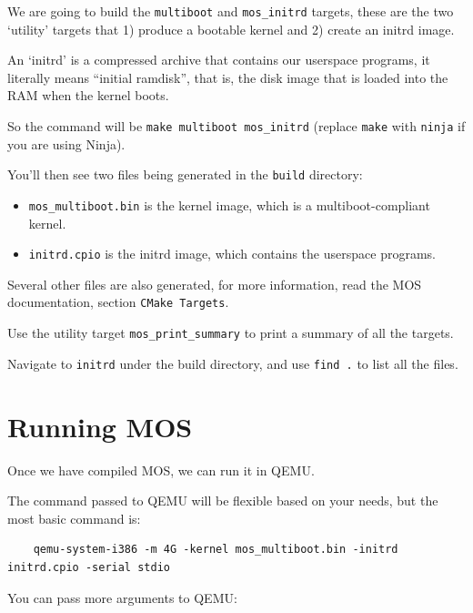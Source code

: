 We are going to build the \texttt{multiboot} and \texttt{mos\_initrd} targets, these are the two
`utility' targets that 1) produce a bootable kernel and 2) create an initrd image.

An `initrd' is a compressed archive that contains our userspace programs, it literally means ``initial ramdisk'',
that is, the disk image that is loaded into the RAM when the kernel boots.

So the command will be \texttt{make multiboot mos\_initrd} (replace \texttt{make} with \texttt{ninja} if you are using Ninja).

You'll then see two files being generated in the \texttt{build} directory:

\begin{itemize}
    \item \texttt{mos\_multiboot.bin} is the kernel image, which is a multiboot-compliant kernel.
    \item \texttt{initrd.cpio} is the initrd image, which contains the userspace programs.
\end{itemize}

Several other files are also generated, for more information, read the MOS documentation, section \texttt{CMake Targets}.

\begin{exercise}
    \item Use the utility target \texttt{mos\_print\_summary} to print a summary of all the targets.
    \item Navigate to \texttt{initrd} under the build directory, and use \texttt{find .} to list all the files.
\end{exercise}

\section{Running MOS}

Once we have compiled MOS, we can run it in QEMU.

The command passed to QEMU will be flexible based on your needs, but the most basic command is:

\begin{verbatim}
    qemu-system-i386 -m 4G -kernel mos_multiboot.bin -initrd initrd.cpio -serial stdio
\end{verbatim}

You can pass more arguments to QEMU:

